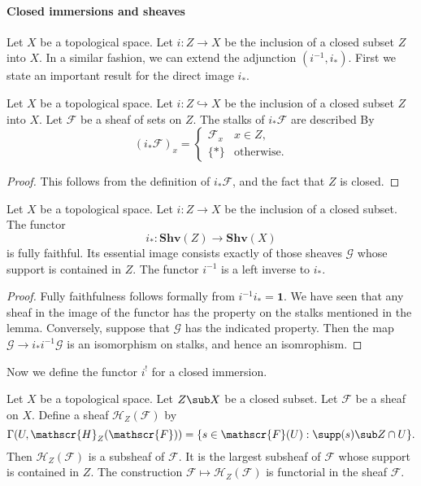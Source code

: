 \paragraph{Closed immersions and sheaves}
Let $X$ be a topological space. Let $i:Z\to X$ be the inclusion of a closed subset $Z$ into $X$. In a similar fashion, we can extend the adjunction $(i^{-1},i_*)$. First we state an important result for the direct image $i_*$.
\begin{lemma}\label{sheaf closed pushforward stalk char}
Let $X$ be a topological space. Let $i:Z\hookrightarrow X$ be the inclusion of a closed subset $Z$ into $X$. Let $\mathscr{F}$ be a sheaf of sets on $Z$. The stalks of $i_*\mathscr{F}$ are described By
\[(i_*\mathscr{F})_x=\begin{cases}
\mathscr{F}_x&x\in Z,\\
\{\ast\}&\text{otherwise}.
\end{cases}\]
\end{lemma}
\begin{proof}
This follows from the definition of $i_*\mathscr{F}$, and the fact that $Z$ is closed.
\end{proof}
\begin{theorem}\label{sheaf closed extension functor prop}
Let $X$ be a topological space. Let $i:Z\to X$ be the inclusion of a closed subset. The functor
\[i_*:\mathbf{Shv}(Z)\to\mathbf{Shv}(X)\]
is fully faithful. Its essential image consists exactly of those sheaves $\mathscr{G}$ whose support is contained in $Z$. The functor $i^{-1}$ is a left inverse to $i_*$.
\end{theorem}
\begin{proof}
Fully faithfulness follows formally from $i^{-1}i_*=\mathbf{1}$. We have seen that any sheaf in the image of the functor has the property on the stalks mentioned in the lemma. Conversely, suppose that $\mathscr{G}$ has the indicated property. Then the map $\mathscr{G}\to i_*i^{-1}\mathscr{G}$ is an isomorphism on stalks, and hence an isomrophism.
\end{proof}
Now we define the functor $i^!$ for a closed immersion.
\begin{proposition}
Let $X$ be a topological space. Let $Z\sub X$ be a closed subset. Let $\mathscr{F}$ be a sheaf on $X$. Define a sheaf $\mathscr{H}_Z(\mathscr{F})$ by
\[\Gamma(U,\mathscr{H}_Z(\mathscr{F}))=\{s\in\mathscr{F}(U):\supp(s)\sub Z\cap U\}.\]
Then $\mathscr{H}_Z(\mathscr{F})$ is a subsheaf of $\mathscr{F}$. It is the largest subsheaf of $\mathscr{F}$ whose support is contained in $Z$. The construction $\mathscr{F}\mapsto\mathscr{H}_Z(\mathscr{F})$ is functorial in the sheaf $\mathscr{F}$.
\end{proposition}
